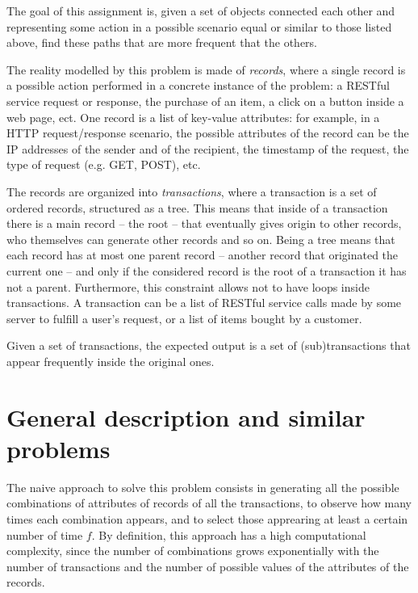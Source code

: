 \documentclass{acm_proc_article-sp-sigmod09}
\begin{document}
The goal of this assignment is, given a set of objects connected each other and representing some action in a possible scenario equal or similar to those listed above, find these paths that are more frequent that the others. 

The reality modelled by this problem is made of \emph{records}, where a single record is a possible action performed in a concrete instance of the problem: a RESTful service request or response, the purchase of an item, a click on a button inside a web page, ect. One record is a list of key-value attributes: for example, in a HTTP request/response scenario, the possible attributes of the record can be the IP addresses of the sender and of the recipient, the timestamp of the request, the type of request (e.g. GET, POST), etc. 

The records are organized into \emph{transactions}, where a transaction is a set of ordered records, structured as a tree. This means that inside of a transaction there is a main record -- the root -- that eventually gives origin to other records, who themselves can generate other records and so on. Being a tree means that each record has at most one parent record -- another record that originated the current one -- and only if the considered record is the root of a transaction it has not a parent. Furthermore, this constraint allows not to have loops inside transactions. A transaction can be a list of RESTful service calls made by some server to fulfill a user's request, or a list of items bought by a customer.

Given a set of transactions, the expected output is a set of (sub)transactions that appear frequently inside the original ones.

\section{General description and similar problems}
The naive approach to solve this problem consists in generating all the possible combinations of attributes of records of all the transactions, to observe how many times each combination appears, and to select those apprearing at least a certain number of time $f$. By definition, this approach has a high computational complexity, since the number of combinations grows exponentially with the number of transactions and the number of possible values of the attributes of the records.
\end{document}
